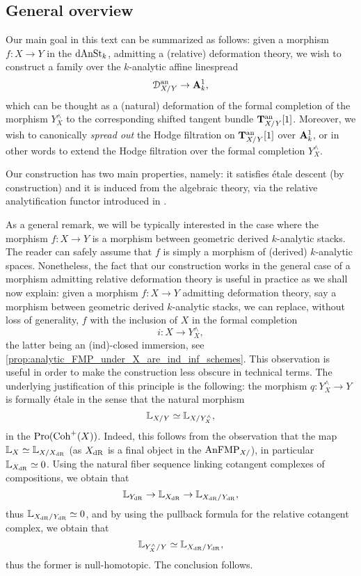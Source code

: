 \documentclass[10pt,a4paper,reqno]{amsart} %
\theoremstyle{plain}
\theoremstyle{definition}
\theoremstyle{remark}
\numberwithin{equation}{section}
\begin{document}
\subsection{General overview} Our main goal in this text can be summarized as follows: given a morphism
$f \colon X \to Y$ in the \infcat $\mathrm{dAnSt}_k$, admitting a (relative) deformation theory, we wish to construct a family over the $k$-analytic affine linespread
    \[
        \mathcal D_{X/ Y} ^\mathrm{an} \to \mathbf A^1_k,  
    \]
which can be thought as a (natural) deformation of the formal completion of the morphism $Y^\wedge_X$ to the corresponding shifted
tangent bundle $\mathbf T^\mathrm{an}_{X/ Y}[1]$. Moreover, we wish to canonically \emph{spread out} the Hodge filtration on $\mathbf T^\mathrm{an}_{X/ Y}[1]$ over $\mathbf A^1_k$, or in other words
to extend the Hodge filtration over the formal completion $Y^\wedge_X$.

Our construction has two main properties, namely: it satisfies \'etale descent (by construction) and it is induced
from the algebraic theory, via the relative analytification functor introduced in \cite{Holstein_Analytification_of_mapping_stacks}.

As a general remark, we will be typically interested in the case where the morphism $f \colon X \to Y$ is a morphism between
geometric derived $k$-analytic stacks. The reader can safely assume that $f$ is simply a morphism of (derived) $k$-analytic spaces.
Nonetheless, the fact that our construction works in the general case of a morphism admitting relative deformation theory is
useful in practice as we shall now explain: given a morphism $f \colon X \to Y$ admitting deformation theory, say a morphism between
geometric derived $k$-analytic stacks, we can replace, without loss of generality, $f$ with the inclusion of $X$ in the formal completion
    \[
        i \colon X \to Y^\wedge_X,
    \]  
the latter being an (ind)-closed immersion, see \cref{prop:analytic_FMP_under_X_are_ind_inf_schemes}. This observation is useful
in order to make the construction less obscure in technical terms. The underlying justification of this principle is the following:
the morphism $q \colon Y^\wedge_X \to Y$ is formally \'etale in the sense that the natural morphism
    \[
        \mathbb L_{X/Y} \simeq  \mathbb L_{X/ Y^\wedge_X},
    \]
in the \infcat $\mathrm{Pro}(\mathrm{Coh}^+(X))$. Indeed, this follows from the observation that the map $\mathbb L_{X} \simeq \mathbb L_{X/ X_{\mathrm{dR}}}$ (as
$X_{\mathrm{dR}}$ is a final object in the \infcat $\mathrm{AnFMP}_{X/ }$), in particular $\mathbb L_{X_{\mathrm{dR}}} \simeq 0$. Using the natural fiber sequence linking
cotangent complexes of compositions, we obtain that
    \[
        \mathbb L_{Y_{\mathrm{dR}}} \to \mathbb L_{X_{\mathrm{dR}}} \to \mathbb L_{X_{\mathrm{dR}}/ Y_{\mathrm{dR}}}   ,
    \]
thus $\mathbb L_{X_{\mathrm{dR}}/ Y_{\mathrm{dR}}} \simeq 0$, and by using the pullback formula for the relative cotangent complex, we obtain that
    \[
        \mathbb L_{Y^\wedge_X/ Y} \simeq \mathbb L_{X_{\mathrm{dR}} / Y_{\mathrm{dR}}},  
    \]
thus the former is null-homotopic. The conclusion follows. 
\end{document}

